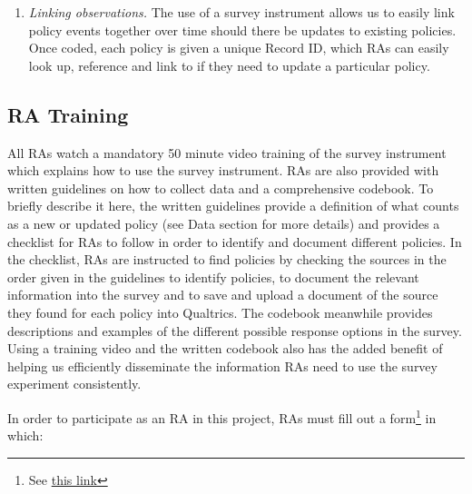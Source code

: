 \documentclass[]{article}
\let\rmarkdownfootnote\footnote%
\def\footnote{\protect\rmarkdownfootnote}
\begin{document}
\begin{enumerate}
\item
  \emph{Linking observations.} The use of a survey instrument allows us to easily link policy events together over time should there be updates to existing policies. Once coded, each policy is given a unique Record ID, which RAs can easily look up, reference and link to if they need to update a particular policy.
\end{enumerate}

\hypertarget{ra-training}{%
\subsection{RA Training}\label{ra-training}}

All RAs watch a mandatory 50 minute video training of the survey instrument which explains how to use the survey instrument. RAs are also provided with written guidelines on how to collect data and a comprehensive codebook. To briefly describe it here, the written guidelines provide a definition of what counts as a new or updated policy (see Data section for more details) and provides a checklist for RAs to follow in order to identify and document different policies. In the checklist, RAs are instructed to find policies by checking the sources in the order given in the guidelines to identify policies, to document the relevant information into the survey and to save and upload a document of the source they found for each policy into Qualtrics. The codebook meanwhile provides descriptions and examples of the different possible response options in the survey. Using a training video and the written codebook also has the added benefit of helping us efficiently disseminate the information RAs need to use the survey experiment consistently.

In order to participate as an RA in this project, RAs must fill out a form\footnote{See \href{https://docs.google.com/forms/d/e/1FAIpQLSeybAW0DC0UE1x2EqLiTifVFuSUxqJLGFB8VI4wVCG61tVYKg/viewform}{this link} } in which:
\end{document}

